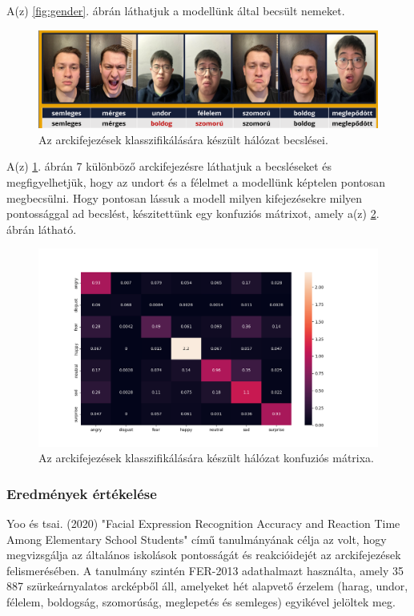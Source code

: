 \documentclass[12pt,a4]{article}
\begin{document}
    A(z) \ref{fig:gender}. ábrán láthatjuk a modellünk által becsült nemeket.

    \newpage
    \begin{figure}[h]	
		\centering
		\includegraphics[width=1\linewidth]{arcanalizis}
        \caption{  Az arckifejezések klasszifikálására készült hálózat becslései.}
        \label{fig:expr}
	\end{figure}

    A(z) \ref{fig:expr}. ábrán 7 különböző arckifejezésre láthatjuk a becsléseket és megfigyelhetjük, hogy az undort és a félelmet a modellünk képtelen pontosan megbecsülni. Hogy pontosan lássuk a modell milyen kifejezésekre milyen pontossággal ad becslést, készitettünk egy konfuziós mátrixot, amely a(z) \ref{fig:cfmatrix}. ábrán látható.

    \begin{figure}[h!]	
		\centering
		\includegraphics[width=1\linewidth]{output_cf_matrix.png}
        \caption{Az arckifejezések klasszifikálására készült hálózat konfuziós mátrixa.}
        \label{fig:cfmatrix}
	\end{figure}

    \subsubsection{Eredmények értékelése}
 
    \cite{facerecresult}Yoo és tsai. (2020) "Facial Expression Recognition Accuracy and Reaction Time Among Elementary School Students" című tanulmányának célja az volt, hogy megvizsgálja az általános iskolások pontosságát és reakcióidejét az arckifejezések felismerésében. A tanulmány szintén FER-2013 adathalmazt használta, amely 35 887 szürkeárnyalatos arcképből áll, amelyeket hét alapvető érzelem (harag, undor, félelem, boldogság, szomorúság, meglepetés és semleges) egyikével jelöltek meg.
\end{document}
